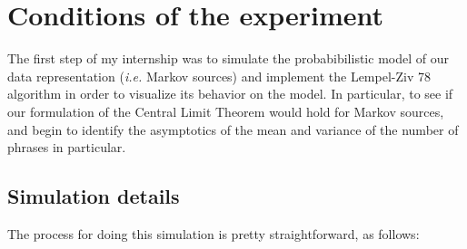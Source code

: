 






\medskip

\section{Conditions of the experiment}

The first step of my internship was to simulate the probabibilistic
model of our data representation (\emph{i.e.} Markov sources) and 
implement the Lempel-Ziv 78 algorithm in order to visualize its 
behavior on the model. In particular, to see if our formulation of the
Central Limit Theorem would hold for Markov sources, and begin to 
identify the asymptotics of the mean and variance of the number 
of phrases in particular.

\subsection{Simulation details}

The process for doing this simulation is pretty straightforward, 
as follows:
	
